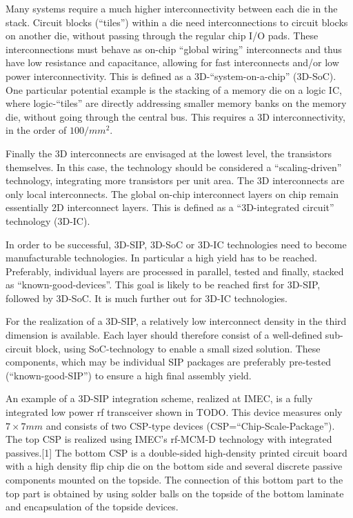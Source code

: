 Many systems require a much higher interconnectivity between
each die in the stack. Circuit blocks (``tiles'') within a die need
interconnections to circuit blocks on another die, without passing
through the regular chip I/O pads. These interconnections must
behave as on-chip ``global wiring'' interconnects and thus have low
resistance and capacitance, allowing for fast interconnects and/or
low power interconnectivity. This is defined as a 3D-``system-on-a-chip'' (3D-SoC). 
One particular potential example is the stacking
of a memory die on a logic IC, where logic-``tiles'' are directly
addressing smaller memory banks on the memory die, without
going through the central bus. This requires a 3D interconnectivity,
in the order of $100/mm^2$.

Finally the 3D interconnects are envisaged at the lowest level,
the transistors themselves. In this case, the technology should
be considered a ``scaling-driven'' technology, integrating more
transistors per unit area. The 3D interconnects are only local
interconnects. The global on-chip interconnect layers on chip
remain essentially 2D interconnect layers. This is defined as a
``3D-integrated circuit'' technology (3D-IC).

In order to be successful, 3D-SIP, 3D-SoC or 3D-IC technologies
need to become manufacturable technologies. In particular a
high yield has to be reached. Preferably, individual layers are
processed in parallel, tested and finally, stacked as ``known-good-devices''.
This goal is likely to be reached first for 3D-SIP, followed
by 3D-SoC. It is much further out for 3D-IC technologies.

For the realization of a 3D-SIP, a relatively low interconnect density
in the third dimension is available. Each layer should therefore
consist of a well-defined sub-circuit block, using SoC-technology
to enable a small sized solution. These components,
which may be individual SIP packages are preferably pre-tested
(``known-good-SIP'') to ensure a high final assembly yield.

An example of a 3D-SIP integration scheme, realized at IMEC, is
a fully integrated low power rf transceiver shown in TODO.
This device measures only $7 \times 7 mm$ and consists of two CSP-type
devices (CSP=``Chip-Scale-Package''). The top CSP is realized
using IMEC's rf-MCM-D technology with integrated passives.[1]
The bottom CSP is a double-sided high-density printed circuit
board with a high density flip chip die on the bottom side and
several discrete passive components mounted on the topside.
The connection of this bottom part to the top part is obtained by
using solder balls on the topside of the bottom laminate and
encapsulation of the topside devices.

